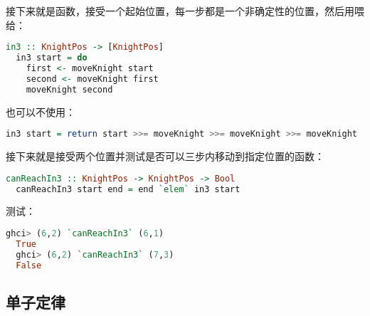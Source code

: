 \documentclass[./main.tex]{subfiles}
\begin{document}
接下来就是函数，接受一个起始位置，每一步都是一个非确定性的位置，然后用\acode{>>=}喂给：

\begin{lstlisting}[language=Haskell]
  in3 :: KnightPos -> [KnightPos]
  in3 start = do
    first <- moveKnight start
    second <- moveKnight first
    moveKnight second
\end{lstlisting}

也可以不使用：

\begin{lstlisting}[language=Haskell]
  in3 start = return start >>= moveKnight >>= moveKnight >>= moveKnight
\end{lstlisting}

接下来就是接受两个位置并测试是否可以三步内移动到指定位置的函数：

\begin{lstlisting}[language=Haskell]
  canReachIn3 :: KnightPos -> KnightPos -> Bool
  canReachIn3 start end = end `elem` in3 start
\end{lstlisting}

测试：

\begin{lstlisting}[language=Haskell]
  ghci> (6,2) `canReachIn3` (6,1)
  True
  ghci> (6,2) `canReachIn3` (7,3)
  False
\end{lstlisting}

\subsection*{单子定律}



\end{document}
